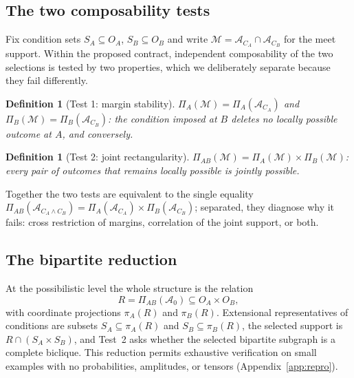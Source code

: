 \documentclass[11pt,a4paper]{article}
\newtheorem{definition}[theorem]{Definition}
\newcommand{\Aref}{\mathcal{A}_0}
\newcommand{\AC}[1]{\mathcal{A}_{#1}}
\newcommand{\OA}{O_A}
\newcommand{\OB}{O_B}
\newcommand{\PiA}{\Pi_A}
\newcommand{\PiB}{\Pi_B}
\newcommand{\PiAB}{\Pi_{AB}}
\begin{document}
  \subsection{The two composability tests}
    \label{ssec:tests}

    Fix condition sets $S_A \subseteq \OA$, $S_B \subseteq \OB$ and write
    $\mathcal{M} = \AC{C_A} \cap \AC{C_B}$ for the meet support.
    Within the proposed contract, independent composability of the two selections is tested by two
    properties, which we deliberately separate because they fail differently.

    \begin{definition}[Test 1: margin stability]
      \label{def:test1}
      $\PiA(\mathcal{M}) = \PiA(\AC{C_A})$ and $\PiB(\mathcal{M}) = \PiB(\AC{C_B})$: the condition imposed
      at $B$ deletes no locally possible outcome at $A$, and conversely.
    \end{definition}

    \begin{definition}[Test 2: joint rectangularity]
      \label{def:test2}
      $\PiAB(\mathcal{M}) = \PiA(\mathcal{M}) \times \PiB(\mathcal{M})$: every pair of outcomes that remains
      locally possible is jointly possible.
    \end{definition}

    Together the two tests are equivalent to the single equality
    $\PiAB(\AC{C_A \wedge C_B}) = \PiA(\AC{C_A}) \times \PiB(\AC{C_B})$; separated, they diagnose why it
    fails: cross restriction of margins, correlation of the joint support, or both.

  \subsection{The bipartite reduction}
    \label{ssec:reduction}

    At the possibilistic level the whole structure is the relation
    \begin{equation}
      R = \PiAB(\Aref) \subseteq \OA \times \OB,
    \end{equation}
    with coordinate projections $\pi_A(R)$ and $\pi_B(R)$.
    Extensional representatives of conditions are subsets $S_A \subseteq \pi_A(R)$ and
    $S_B \subseteq \pi_B(R)$, the selected support is $R \cap (S_A \times S_B)$, and Test~2 asks whether the
    selected bipartite subgraph is a complete biclique.
    This reduction permits exhaustive verification on small examples with no probabilities, amplitudes, or
    tensors (Appendix~\ref{app:repro}).
\end{document}
